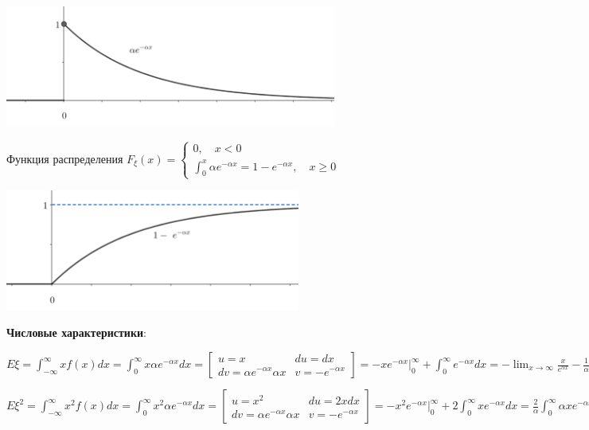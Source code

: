 \documentclass[12pt]{article}
\begin{document}
    \includegraphics[height=4cm]{probtheory/images/probtheory_2024_10_29_3}

    Функция распределения $F_\xi(x) = \begin{cases}0, \quad x < 0 \\ \int_0^x \alpha e^{-\alpha x} = 1 - e^{-\alpha x}, \quad x \geq 0\end{cases}$

    \includegraphics[height=4cm]{probtheory/images/probtheory_2024_10_29_4}

    \textbf{Числовые характеристики}:

    $E\xi = \int_{-\infty}^\infty x f(x) dx = \int_0^\infty x \alpha e^{-\alpha x} dx = \left[\begin{matrix}u = x & du = dx \\ dv = \alpha e^{-\alpha x} \alpha x & v = -e^{-\alpha x}\end{matrix}\right] = -xe^{-\alpha x} \Big|_0^\infty + \int_0^\infty e^{-\alpha x} dx = 
    -\lim_{x \to \infty} \frac{x}{e^{\alpha x}} - \frac{1}{\alpha} e^{-\alpha x} \Big|_0^\infty = -\lim_{x \to \infty} \frac{1}{\alpha e^{\alpha x}} - \frac{1}{\alpha} (\lim_{x \to \infty} e^{-\alpha x} - 1) = \frac{1}{\alpha}$


    $E\xi^2 = \int_{-\infty}^\infty x^2 f(x) dx = \int_0^\infty x^2 \alpha e^{-\alpha x} dx = \left[\begin{matrix}u = x^2 & du = 2xdx \\ dv = \alpha e^{-\alpha x} \alpha x & v = -e^{-\alpha x}\end{matrix}\right] = -x^2 e^{-\alpha x} \Big|_0^\infty + 2\int_0^\infty x e^{-\alpha x} dx = 
    \frac{2}{\alpha} \int_0^\infty \alpha x e^{-\alpha x} = \frac{2}{\alpha} E\xi = \frac{2}{\alpha^2}$
\end{document}
